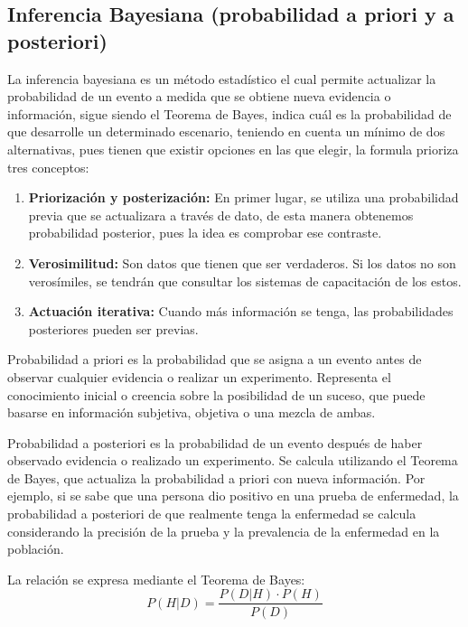 \subsection{Inferencia Bayesiana (probabilidad a priori y a posteriori)}

La inferencia bayesiana es un método estadístico el cual permite actualizar la probabilidad de un evento a medida que se obtiene nueva evidencia o información, sigue siendo el Teorema de Bayes, indica cuál es la probabilidad de que desarrolle un determinado escenario, teniendo en cuenta un mínimo de dos alternativas, pues tienen que existir opciones en las que elegir, la formula prioriza tres conceptos:

\begin{enumerate}
    \item \textbf{Priorización y posterización:} En primer lugar, se utiliza una probabilidad previa que se actualizara a través de dato, de esta manera obtenemos probabilidad posterior, pues la idea es comprobar ese contraste.
    \item \textbf{Verosimilitud:} Son datos que tienen que ser verdaderos. Si los datos no son verosímiles, se tendrán que consultar los sistemas de capacitación de los estos.
    \item \textbf{Actuación iterativa:} Cuando más información se tenga, las probabilidades posteriores pueden ser previas.
\end{enumerate}

Probabilidad a priori es la probabilidad que se asigna a un evento antes de observar cualquier evidencia o realizar un experimento. Representa el conocimiento inicial o creencia sobre la posibilidad de un suceso, que puede basarse en información subjetiva, objetiva o una mezcla de ambas.

Probabilidad a posteriori es la probabilidad de un evento después de haber observado evidencia o realizado un experimento. Se calcula utilizando el Teorema de Bayes, que actualiza la probabilidad a priori con nueva información. Por ejemplo, si se sabe que una persona dio positivo en una prueba de enfermedad, la probabilidad a posteriori de que realmente tenga la enfermedad se calcula considerando la precisión de la prueba y la prevalencia de la enfermedad en la población.

La relación se expresa mediante el Teorema de Bayes:
\begin{equation}
P(H|D) = \frac{P(D|H) \cdot P(H)}{P(D)}
\end{equation}

